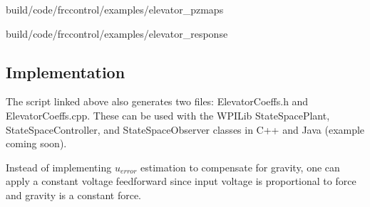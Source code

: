 \begin{svg}{build/code/frccontrol/examples/elevator_pzmaps}
  \caption{Elevator pole-zero maps}
  \label{fig:elevator_pzmaps}
\end{svg}

\begin{svg}{build/code/frccontrol/examples/elevator_response}
  \caption{Elevator response}
  \label{fig:elevator_response}
\end{svg}

\subsection{Implementation}

The script linked above also generates two files: ElevatorCoeffs.h and
ElevatorCoeffs.cpp. These can be used with the WPILib StateSpacePlant,
StateSpaceController, and StateSpaceObserver classes in C++ and Java (example
coming soon).

\begin{remark}
  Instead of implementing $u_{error}$ estimation to compensate for gravity, one
  can apply a constant voltage feedforward since input voltage is proportional
  to force and gravity is a constant force.
\end{remark}
